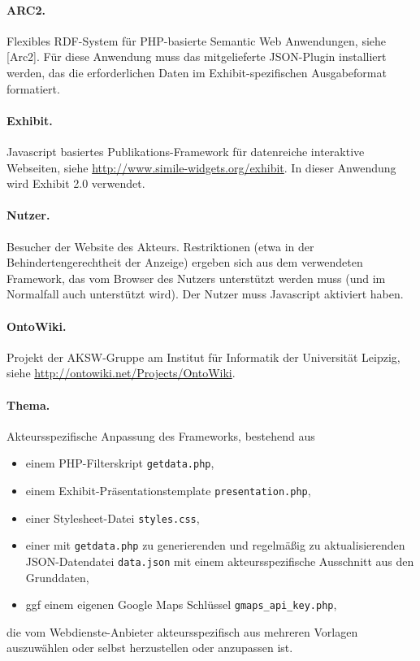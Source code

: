 \documentclass[11pt,a4paper]{article}
\begin{document}
\paragraph{ARC2.} 
Flexibles RDF-System für PHP-basierte Semantic Web Anwendungen, siehe [Arc2].
Für diese Anwendung muss das mitgelieferte JSON-Plugin installiert werden, das
die erforderlichen Daten im Exhibit-spezifischen Ausgabeformat formatiert. 

\paragraph{Exhibit.} 
Javascript basiertes Publikations-Framework für datenreiche interaktive
Webseiten, siehe \url{http://www.simile-widgets.org/exhibit}.  In dieser
Anwendung wird Exhibit 2.0 verwendet.

\paragraph{Nutzer.} 
Besucher der Website des Akteurs. Restriktionen (etwa in der
Behindertengerechtheit der Anzeige) ergeben sich aus dem verwendeten
Framework, das vom Browser des Nutzers unterstützt werden muss (und im
Normalfall auch unterstützt wird). Der Nutzer muss Javascript aktiviert haben.

\paragraph{OntoWiki.} 
Projekt der AKSW-Gruppe am Institut für Informatik der Universität Leipzig,
siehe \url{http://ontowiki.net/Projects/OntoWiki}.

\paragraph{Thema.} 
Akteursspezifische Anpassung des Frameworks, bestehend aus 
\begin{itemize}
\item einem PHP-Filterskript \texttt{getdata.php},
\item einem Exhibit-Präsentationstemplate \texttt{presentation.php},
\item einer Stylesheet-Datei \texttt{styles.css},
\item einer mit \texttt{getdata.php} zu generierenden und regelmäßig zu
  aktualisierenden JSON-Datendatei \texttt{data.json} mit einem
  akteursspezifische Ausschnitt aus den Grunddaten,
\item ggf einem eigenen Google Maps Schlüssel \texttt{gmaps\_api\_key.php},
\end{itemize}
die vom Webdienste-Anbieter akteursspezifisch aus mehreren Vorlagen
auszuwählen oder selbst herzustellen oder anzupassen ist.
\end{document}
